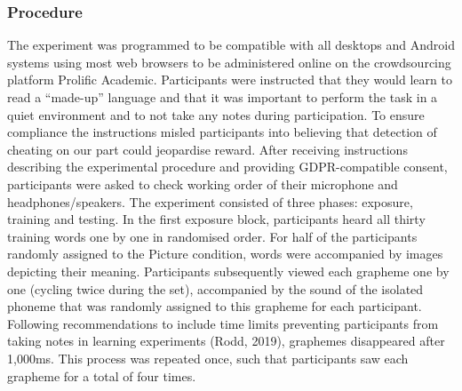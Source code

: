 \documentclass[doc,floatsintext]{apa6}
\begin{document}
\subsubsection{Procedure}\label{procedure}

The experiment was programmed to be compatible with all desktops and
Android systems using most web browsers to be administered online on the
crowdsourcing platform Prolific Academic. Participants were instructed
that they would learn to read a \enquote{made-up} language and that it
was important to perform the task in a quiet environment and to not take
any notes during participation. To ensure compliance the instructions
misled participants into believing that detection of cheating on our
part could jeopardise reward. After receiving instructions describing
the experimental procedure and providing GDPR-compatible consent,
participants were asked to check working order of their microphone and
headphones/speakers. The experiment consisted of three phases: exposure,
training and testing. In the first exposure block, participants heard
all thirty training words one by one in randomised order. For half of
the participants randomly assigned to the Picture condition, words were
accompanied by images depicting their meaning. Participants subsequently
viewed each grapheme one by one (cycling twice during the set),
accompanied by the sound of the isolated phoneme that was randomly
assigned to this grapheme for each participant. Following
recommendations to include time limits preventing participants from
taking notes in learning experiments (Rodd, 2019), graphemes disappeared
after 1,000ms. This process was repeated once, such that participants
saw each grapheme for a total of four times.
\end{document}
